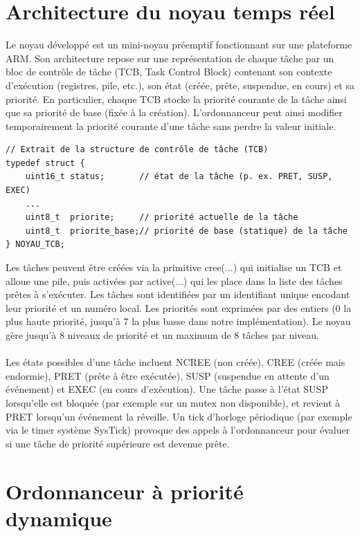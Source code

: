 \documentclass{latexPackage/utc-report/utc-report}
\begin{document}
\pagebreak

\section{Architecture du noyau temps réel}

Le noyau développé est un mini-noyau préemptif fonctionnant sur une plateforme ARM. Son architecture repose sur une représentation de chaque tâche par un bloc de contrôle de tâche (TCB, Task Control Block) contenant son contexte d’exécution (registres, pile, etc.), son état (créée, prête, suspendue, en cours) et sa priorité. En particulier, chaque TCB stocke la priorité courante de la tâche ainsi que sa priorité de base (fixée à la création). L’ordonnanceur peut ainsi modifier temporairement la priorité courante d’une tâche sans perdre la valeur initiale.

\begin{verbatim}
// Extrait de la structure de contrôle de tâche (TCB)
typedef struct {
    uint16_t status;       // état de la tâche (p. ex. PRET, SUSP, EXEC)
    ...
    uint8_t  priorite;     // priorité actuelle de la tâche
    uint8_t  priorite_base;// priorité de base (statique) de la tâche
} NOYAU_TCB;
\end{verbatim}

Les tâches peuvent être créées via la primitive cree(...) qui initialise un TCB et alloue une pile, puis activées par active(...) qui les place dans la liste des tâches prêtes à s’exécuter. Les tâches sont identifiées par un identifiant unique encodant leur priorité et un numéro local. Les priorités sont exprimées par des entiers (0 la plus haute priorité, jusqu’à 7 la plus basse dans notre implémentation). Le noyau gère jusqu’à 8 niveaux de priorité et un maximum de 8 tâches par niveau.
\\\\
Les états possibles d’une tâche incluent NCREE (non créée), CREE (créée mais endormie), PRET (prête à être exécutée), SUSP (suspendue en attente d’un événement) et EXEC (en cours d’exécution). Une tâche passe à l’état SUSP lorsqu’elle est bloquée (par exemple sur un mutex non disponible), et revient à PRET lorsqu’un événement la réveille. Un tick d’horloge périodique (par exemple via le timer système SysTick) provoque des appels à l’ordonnanceur pour évaluer si une tâche de priorité supérieure est devenue prête.

\pagebreak

\section{Ordonnanceur à priorité dynamique}
\end{document}

